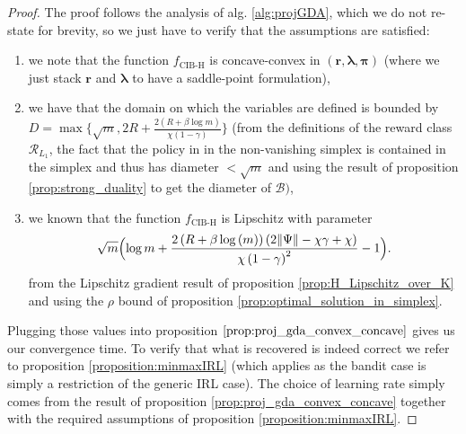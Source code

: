   \begin{proof}
    The proof follows the analysis of alg. \ref{alg:projGDA}, which we do not re-state for brevity, so we just have to verify that the assumptions are satisfied:
    \begin{enumerate}
        \item we note that the function $f_\text{CIB-H}$ is concave-convex in $(\bm{r},\bm{\lambda},\bm{\pi})$ (where we just stack $\bm{r}$ and $\bm{\lambda}$ to have a saddle-point formulation),
        \item we have that the domain on which the variables are defined is bounded by $D= \max\Big\{\sqrt{m},2R +\frac{2(R +\beta \log m)}{\chi (1-\gamma)} \Big\} $ (from the definitions of the reward class $\mathcal{R}_{L_1}$, the fact that the policy in in the non-vanishing simplex is contained in the simplex and thus has diameter $<\sqrt{m}$ and using the result of proposition \ref{prop:strong_duality} to get the diameter of $\mathcal{B})$,
        \item we known that the function $f_\text{CIB-H}$ is Lipschitz with parameter \[
            \sqrt{m} 
            \Bigl( \log m +
            \frac{2\left(R + \beta \log{\left(m \right)}\right) \left(2  \|\Psi\| - \chi \gamma + \chi\right)}{\chi \left(1- \gamma\right)^{2}} 
            -1
            \Bigr).    
        \] from the Lipschitz gradient result of proposition \ref{prop:H_Lipschitz_over_K} and using the $\rho$ bound of proposition \ref{prop:optimal_solution_in_simplex}.
    \end{enumerate}
    Plugging those values into proposition $\ref{prop:proj_gda_convex_concave}$ gives us our convergence time. To verify that what is recovered is indeed correct we refer to proposition \ref{proposition:minmaxIRL} (which applies as the bandit case is simply a restriction of the generic IRL case). The choice of learning rate simply comes from the result of proposition \ref{prop:proj_gda_convex_concave} together with the required assumptions of proposition \ref{proposition:minmaxIRL}.
\end{proof}

